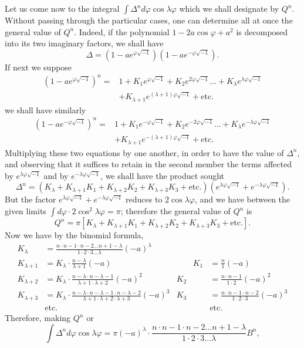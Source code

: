 \documentclass{article}
\begin{document}
Let us come now to the integral $\displaystyle\int\Delta^{n}d\varphi\cos\lambda\varphi$ which we shall designate by $Q^{n}$. Without passing through the particular cases, one can determine all at once the general value of $Q^{n}$. Indeed, if the polynomial $1-2a\cos\varphi+a^{2}$ is decomposed into its two imaginary factors, we shall have
\[ \Delta=(1-ae^{\varphi\sqrt{-1}})(1-ae^{-\varphi\sqrt{-1}}). \]
If next we suppose
\[ \begin{aligned} (1-ae^{\varphi\sqrt{-1}})^{n}={}&1+K_{1}e^{\varphi\sqrt{-1}}+K_{2}e^{2\varphi\sqrt{-1}}\ldots+K_{\lambda}e^{\lambda\varphi\sqrt{-1}}\\ &+K_{\lambda+1}e^{(\lambda+1)\varphi\sqrt{-1}}+\text{etc.} \end{aligned} \]
we shall have similarly
\[ \begin{aligned} (1-ae^{-\varphi\sqrt{-1}})^{n}={}&1+K_{1}e^{-\varphi\sqrt{-1}}+K_{2}e^{-2\varphi\sqrt{-1}}\ldots+K_{\lambda}e^{-\lambda\varphi\sqrt{-1}}\\ &+K_{\lambda+1}e^{-(\lambda+1)\varphi\sqrt{-1}}+\text{etc.} \end{aligned} \]
Multiplying these two equations by one another, in order to have the value of $\Delta^{n}$, and observing that it suffices to retain in the second member the terms affected by $e^{\lambda\varphi\sqrt{-1}}$ and by $e^{-\lambda\varphi\sqrt{-1}}$, we shall have the product sought
\[ \Delta^{n}=(K_{\lambda}+K_{\lambda+1}K_{1}+K_{\lambda+2}K_{2}+K_{\lambda+3}K_{3}+\text{etc.})(e^{\lambda\varphi\sqrt{-1}}+e^{-\lambda\varphi\sqrt{-1}}). \]
But the factor $e^{\lambda\varphi\sqrt{-1}}+e^{-\lambda\varphi\sqrt{-1}}$ reduces to $2\cos\lambda\varphi$, and we have between the given limits $\displaystyle\int d\varphi\cdot2\cos^{2}\lambda\varphi=\pi$; therefore the general value of $Q^{n}$ is
\[ Q^{n}=\pi[K_{\lambda}+K_{\lambda+1}K_{1}+K_{\lambda+2}K_{2}+K_{\lambda+3}K_{3}+\text{etc.}]. \]
Now we have by the binomial formula,
\[ \begin{aligned} K_{\lambda}&=\frac{n\cdot n-1\cdot n-2\ldots n+1-\lambda}{1\cdot2\cdot3\ldots\lambda}(-a)^{\lambda}\\ K_{\lambda+1}&=K_{\lambda}\cdot\frac{n-\lambda}{\lambda+1}(-a) &\qquad K_{1}&=\frac{n}{1}(-a)\\ K_{\lambda+2}&=K_{\lambda}\cdot\frac{n-\lambda\cdot n-\lambda-1}{\lambda+1\cdot\lambda+2}(-a)^{2} & K_{2}&=\frac{n\cdot n-1}{1\cdot2}(-a)^{2}\\ K_{\lambda+3}&=K_{\lambda}\cdot\frac{n-\lambda\cdot n-\lambda-1\cdot n-\lambda-2}{\lambda+1\cdot\lambda+2\cdot\lambda+3}(-a)^{3} & K_{3}&=\frac{n\cdot n-1\cdot n-2}{1\cdot2\cdot3}(-a)^{3}\\ &\text{etc.} && \text{etc.} \end{aligned} \]
Therefore, making $Q^{n}$ or
\[ \int\Delta^{n}d\varphi\cos\lambda\varphi=\pi(-a)^{\lambda}\cdot\frac{n\cdot n-1\cdot n-2\ldots n+1-\lambda}{1\cdot2\cdot3\ldots\lambda}B^{n}, \]
\end{document}
